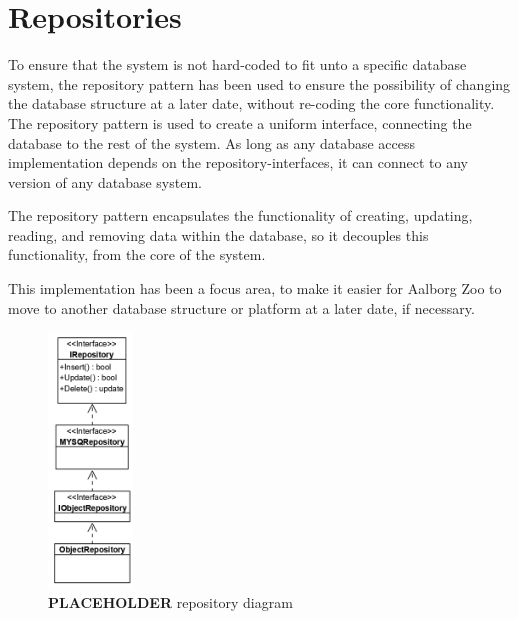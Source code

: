 \section{Repositories}
To ensure that the system is not hard-coded to fit unto a specific database system, the repository pattern \citep{RepositoryPattern} has been used to ensure the possibility of changing the database structure at a later date, without re-coding the core functionality. The repository pattern is used to create a uniform interface, connecting the database to the rest of the system. As long as any database access implementation depends on the repository-interfaces, it can connect to any version of any database system.
\par
The repository pattern encapsulates the functionality of creating, updating, reading, and removing data within the database, so it decouples this functionality, from the core of the system. 
\par
This implementation has been a focus area, to make it easier for Aalborg Zoo to move to another database structure or platform at a later date, if necessary. 

\begin{figure}[H]
    \centering
    \includegraphics[width=0.2\textwidth]{figures/Implementation/GenericRepositoryStructure.PNG}
    \caption{\textbf{PLACEHOLDER} repository diagram}
    \label{fig:RepositoryDiagram}
\end{figure}

